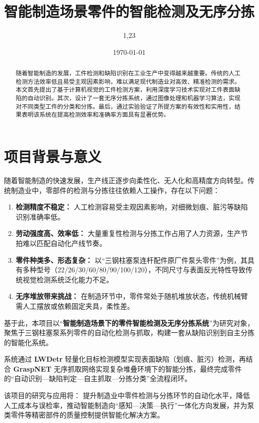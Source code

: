 \documentclass{cumcmthesis}
\title{智能制造场景零件的智能检测及无序分拣}
\date{\today}
\author{1,23}
\begin{document}
\maketitle
\newpage
\begin{abstract}
随着智能制造的发展，工件检测和缺陷识别在工业生产中变得越来越重要。传统的人工检测方法效率低且易受主观因素影响，难以满足现代制造业对高效、精准检测的需求。
本文首先提出了基于计算机视觉的工件检测方案，利用深度学习技术实现对工件表面缺陷的自动识别。其次，设计了一套无序分拣系统，通过图像处理和机器学习算法，实现对不同类型工件的分类和分拣。最后，通过实验验证了所提方案的有效性和实用性，结果表明该系统在提高检测效率和准确率方面具有显著优势。
\end{abstract}

\section{项目背景与意义}

随着智能制造的快速发展，生产线正逐步向柔性化、无人化和高精度方向转型。传统制造业中，零部件的检测与分拣往往依赖人工操作，存在以下问题：

\begin{enumerate}
    \item \textbf{检测精度不稳定：} 人工检测容易受主观因素影响，对细微划痕、脏污等缺陷识别准确率低。
    \item \textbf{劳动强度高、效率低：} 大量重复性检测与分拣工作占用了人力资源，生产节拍难以匹配自动化产线节奏。
    \item \textbf{零件种类多、形态复杂：} 以“三钢柱塞泵连杆配件原厂件泵头零件”为例，其具有多种型号（22/26/30/60/80/90/100/120），不同尺寸与表面反光特性导致传统视觉检测系统泛化能力不足。
    \item \textbf{无序堆放带来挑战：} 在制造环节中，零件常处于随机堆放状态，传统机械臂需人工摆放或依赖固定夹具，柔性差。
\end{enumerate}

基于此，本项目以“\textbf{智能制造场景下的零件智能检测及无序分拣系统}”为研究对象，聚焦于三钢柱塞泵系列零件的自动化检测与抓取，构建一套从缺陷识别到自主分拣的智能化系统。

系统通过 \textbf{LWDetr} 轻量化目标检测模型实现表面缺陷（划痕、脏污）检测，再结合 \textbf{GraspNET} 无序抓取网络实现复杂堆叠环境下的智能分拣，最终完成零件的“自动识别—缺陷判定—自主抓取—分拣分类”全流程闭环。

该项目的研究与应用将：
提升制造业中零件检测与分拣环节的自动化水平，降低人工成本与误检率，推动智能制造向“感知—决策—执行”一体化方向发展，并为泵类零件等精密部件的质量控制提供智能化解决方案。
\end{document}
